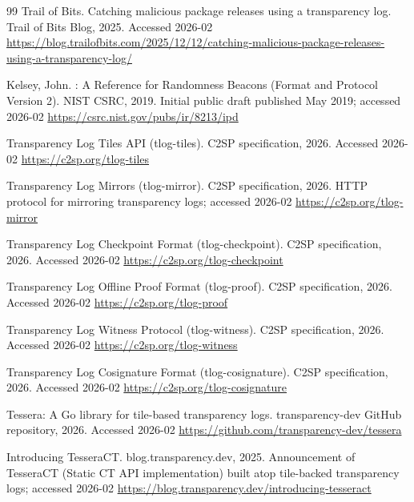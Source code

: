\documentclass[11pt]{article}
\begin{document}
\begin{thebibliography}{99}
{Trail of Bits}.
\newblock Catching malicious package releases using a transparency log.
\newblock Trail of Bits Blog, 2025.
\newblock Accessed 2026-02
\newblock \url{https://blog.trailofbits.com/2025/12/12/catching-malicious-package-releases-using-a-transparency-log/}

Kelsey, John.
: A Reference for Randomness Beacons (Format and Protocol Version 2).
\newblock NIST CSRC, 2019.
\newblock Initial public draft published May 2019; accessed 2026-02
\newblock \url{https://csrc.nist.gov/pubs/ir/8213/ipd}

\newblock Transparency Log Tiles API (tlog-tiles).
\newblock C2SP specification, 2026.
\newblock Accessed 2026-02
\newblock \url{https://c2sp.org/tlog-tiles}

\newblock Transparency Log Mirrors (tlog-mirror).
\newblock C2SP specification, 2026.
\newblock HTTP protocol for mirroring transparency logs; accessed 2026-02
\newblock \url{https://c2sp.org/tlog-mirror}

\newblock Transparency Log Checkpoint Format (tlog-checkpoint).
\newblock C2SP specification, 2026.
\newblock Accessed 2026-02
\newblock \url{https://c2sp.org/tlog-checkpoint}

\newblock Transparency Log Offline Proof Format (tlog-proof).
\newblock C2SP specification, 2026.
\newblock Accessed 2026-02
\newblock \url{https://c2sp.org/tlog-proof}

\newblock Transparency Log Witness Protocol (tlog-witness).
\newblock C2SP specification, 2026.
\newblock Accessed 2026-02
\newblock \url{https://c2sp.org/tlog-witness}

\newblock Transparency Log Cosignature Format (tlog-cosignature).
\newblock C2SP specification, 2026.
\newblock Accessed 2026-02
\newblock \url{https://c2sp.org/tlog-cosignature}

\newblock Tessera: A Go library for tile-based transparency logs.
\newblock transparency-dev GitHub repository, 2026.
\newblock Accessed 2026-02
\newblock \url{https://github.com/transparency-dev/tessera}

\newblock Introducing TesseraCT.
\newblock blog.transparency.dev, 2025.
\newblock Announcement of TesseraCT (Static CT API implementation) built atop tile-backed transparency logs; accessed 2026-02
\newblock \url{https://blog.transparency.dev/introducing-tesseract}


\end{thebibliography}
\end{document}
